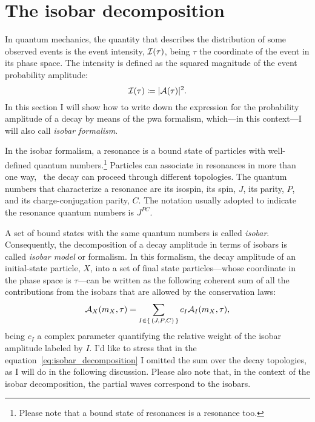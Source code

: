 \section{The isobar decomposition}

    In quantum mechanics, the quantity that describes the distribution of some observed events is the event intensity, $\mathcal{I}(\tau)$, being $\tau$ the coordinate of the event in its phase space.
    The intensity is defined as the squared magnitude of the event probability amplitude:
    \begin{equation}
        \mathcal{I}(\tau) \coloneqq \lvert\mathcal{A}(\tau)\rvert^2.
    \end{equation}
    In this section I will show how to write down the expression for the probability amplitude of a decay by means of the \ac{pwa} formalism, which---in this context---I will also call \emph{isobar formalism}.


    In the isobar formalism, a resonance is a bound state of particles with well-defined quantum numbers.\footnote{Please note that a bound state of resonances is a resonance too.}
    Particles can associate in resonances in more than one way, \ie~the decay can proceed through different topologies.
    The quantum numbers that characterize a resonance are its isospin, its spin, $J$, its parity, $P$, and its charge-conjugation parity, $C$.
    The notation usually adopted to indicate the resonance quantum numbers is $J^{PC}$.


    A set of bound states with the same quantum numbers is called \emph{isobar}.
    Consequently, the decomposition of a decay amplitude in terms of isobars is called \emph{isobar model} or formalism.
    In this formalism, the decay amplitude of an initial-state particle, $X$, into a set of final state particles---whose coordinate in the phase space is $\tau$---can be written as the following coherent sum of all the contributions from the isobars that are allowed by the conservation laws:
    \begin{equation}\label{eq:isobar_decomposition}
        \mathcal{A}_X(m_X,\tau) = \sum_{I\in\set{(J, P, C)}} c_I \mathcal{A}_I(m_X, \tau),
    \end{equation}
    being $c_I$ a complex parameter quantifying the relative weight of the isobar amplitude labeled by $I$.
    I'd like to stress that in the equation~\eqref{eq:isobar_decomposition} I omitted the sum over the decay topologies, as I will do in the following discussion.
    Please also note that, in the context of the isobar decomposition, the partial waves correspond to the isobars.


